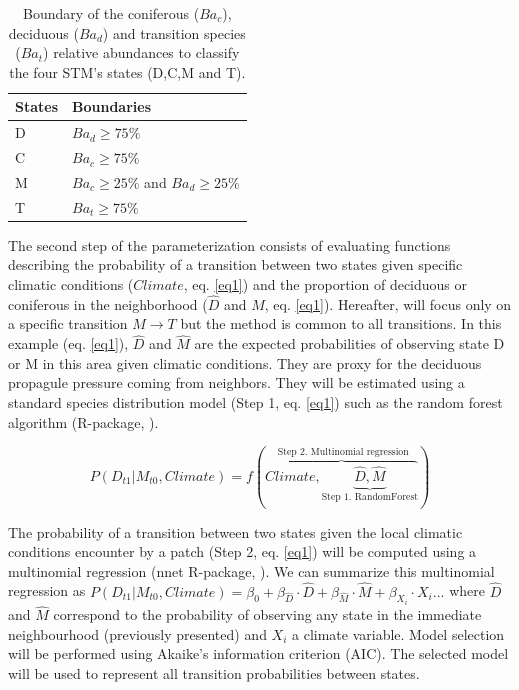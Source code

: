 \begin{table}[h]
\vspace{-1em}
\centering
\caption{Boundary of the coniferous ($Ba_c$), deciduous ($Ba_d$) and transition species ($Ba_t$) relative abundances to classify the four STM's states (D,C,M and T).}
\vspace{-1em}
\small
\begin{tabular}{|l|l|}
	\hline
	\textbf{States}  & \textbf{Boundaries}                            \\
	\hline
	D & $Ba_d \geq 75\%$    \\
	C & $Ba_c \geq 75\%$   \\
	M & $Ba_c \geq 25\%$ and $Ba_d \geq 25\%$ \\
	T & $Ba_t  \geq 75\%$ \\
	\hline
\end{tabular}

\label{bound}
\end{table}

The second step of the parameterization consists of evaluating functions
describing the probability of a transition between two states given specific
climatic conditions ($Climate$, eq. \ref{eq1}) and the proportion of deciduous
or coniferous in the neighborhood ($\hat{D}$ and $\hat{M}$, eq. \ref{eq1}).
Hereafter, will focus only on a specific transition $M \rightarrow T$ but the
method is common to  all transitions. In this example (eq. \ref{eq1}),
$\hat{D}$ and $\hat{M}$ are the expected probabilities of observing state D or
M in this area given climatic conditions. They are proxy for the deciduous
propagule pressure coming from neighbors. They will be estimated using  a
standard species distribution model (Step 1, eq. \ref{eq1}) such as the random
forest algorithm (R-package, \cite{Liaw2002a}).


\begin{equation}
	P(D_{t1}|M_{t0}, Climate) = f(\overbrace{Climate, \underbrace{\hat{D}, \hat{M}}_\text{Step 1. RandomForest}}^\text{ Step 2. Multinomial regression})
\label{eq1}
\end{equation}

The probability of a transition between two states given the local climatic
conditions encounter by a patch (Step 2, eq. \ref{eq1}) will be computed using
a multinomial regression (nnet R-package, \cite{Venables2002}). We can
summarize this multinomial regression as $P(D_{t1}|M_{t0},Climate) = \beta_0 +
\beta_{\hat{D}} \cdot \hat{D} + \beta_{\hat{M}} \cdot \hat{M} + \beta_{X_i}
\cdot X_i... $ where $\hat{D}$ and $\hat{M}$ correspond to the probability of
observing any state in the immediate neighbourhood (previously presented) and
$X_i$ a climate variable. Model selection will be performed using Akaike's
information criterion (AIC). The selected model will be used to represent all
transition probabilities between states. \\

